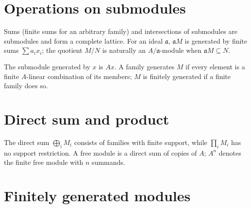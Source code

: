 \section{Operations on submodules}
\label{am-ch2-operations}
\begin{remark}
\label{am-rem-module-lattice}
\uses{}
Sums (finite sums for an arbitrary family) and intersections of submodules are
submodules and form a complete lattice.  For an ideal $\mathfrak{a}$,
$\mathfrak{a}M$ is generated by finite sums $\sum a_ix_i$; the quotient
$M/N$ is naturally an $A/\mathfrak{a}$-module when $\mathfrak{a}M\subseteq N$.
\end{remark}
\begin{definition}
\label{am-def-module-generators}
\uses{}
The submodule generated by $x$ is $Ax$.  A family generates $M$ if every
element is a finite $A$-linear combination of its members; $M$ is finitely
generated if a finite family does so.
\end{definition}

\section{Direct sum and product}
\label{am-ch2-direct-sum-product}

\begin{definition}
\label{am-def-direct-free}
\uses{}
The direct sum $\bigoplus_iM_i$ consists of families with finite support, while
$\prod_iM_i$ has no support restriction.  A free module is a direct sum of
copies of $A$; $A^n$ denotes the finite free module with $n$ summands.
\end{definition}

\section{Finitely generated modules}
\label{am-ch2-finitely-generated}

